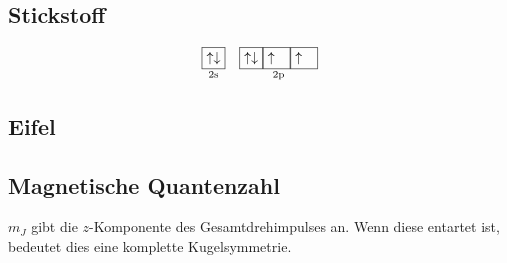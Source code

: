 \subsection{Stickstoff}

\[
	\underset{\text{2s}}{\fbox{$\uparrow \downarrow$}}
	\quad
	\underset{\text{2p}}{\fbox{$\uparrow\downarrow$}\fbox{$\uparrow\phantom\downarrow$}\fbox{$\uparrow\phantom\downarrow$}}
\]

\subsection{Eifel}

\subsection{Magnetische Quantenzahl}

$m_J$ gibt die $z$-Komponente des Gesamtdrehimpulses an. Wenn diese entartet
ist, bedeutet dies eine komplette Kugelsymmetrie.


\IfFileExists{\bibliographyfile}{
}{}



